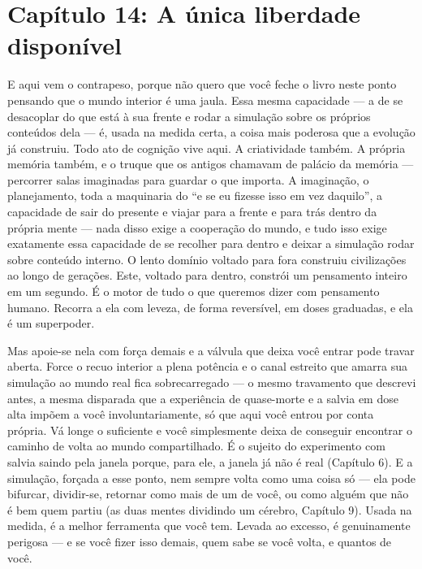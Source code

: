 \documentclass[11pt, twoside, openright]{book}
\begin{document}
\chapter*{Capítulo 14: A única liberdade disponível}

E aqui vem o contrapeso, porque não quero que você feche o livro neste ponto pensando que o mundo interior é uma jaula. Essa mesma capacidade --- a de se desacoplar do que está à sua frente e rodar a simulação sobre os próprios conteúdos dela --- é, usada na medida certa, a coisa mais poderosa que a evolução já construiu. Todo ato de cognição vive aqui. A criatividade também. A própria memória também, e o truque que os antigos chamavam de palácio da memória --- percorrer salas imaginadas para guardar o que importa. A imaginação, o planejamento, toda a maquinaria do ``e se eu fizesse isso em vez daquilo'', a capacidade de sair do presente e viajar para a frente e para trás dentro da própria mente --- nada disso exige a cooperação do mundo, e tudo isso exige exatamente essa capacidade de se recolher para dentro e deixar a simulação rodar sobre conteúdo interno. O lento domínio voltado para fora construiu civilizações ao longo de gerações. Este, voltado para dentro, constrói um pensamento inteiro em um segundo. É o motor de tudo o que queremos dizer com pensamento humano. Recorra a ela com leveza, de forma reversível, em doses graduadas, e ela é um superpoder.

Mas apoie-se nela com força demais e a válvula que deixa você entrar pode travar aberta. Force o recuo interior a plena potência e o canal estreito que amarra sua simulação ao mundo real fica sobrecarregado --- o mesmo travamento que descrevi antes, a mesma disparada que a experiência de quase-morte e a salvia em dose alta impõem a você involuntariamente, só que aqui você entrou por conta própria. Vá longe o suficiente e você simplesmente deixa de conseguir encontrar o caminho de volta ao mundo compartilhado. É o sujeito do experimento com salvia saindo pela janela porque, para ele, a janela já não é real (Capítulo 6). E a simulação, forçada a esse ponto, nem sempre volta como uma coisa só --- ela pode bifurcar, dividir-se, retornar como mais de um de você, ou como alguém que não é bem quem partiu (as duas mentes dividindo um cérebro, Capítulo 9). Usada na medida, é a melhor ferramenta que você tem. Levada ao excesso, é genuinamente perigosa --- e se você fizer isso demais, quem sabe se você volta, e quantos de você.
\end{document}
